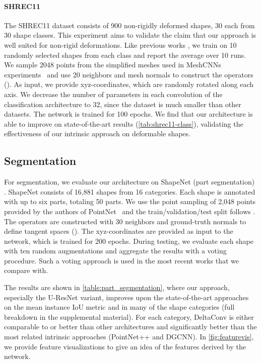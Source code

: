 \documentclass[acmtog, authorversion]{acmart}
\begin{document}
\paragraph{SHREC11}
The SHREC11 dataset \cite{lian2011} consists of 900 non-rigidly deformed shapes, 30 each from 30 shape classes. This experiment aims to validate the claim that our approach is well suited for non-rigid deformations. Like previous works \cite{hanocka2019meshcnn, Wiersma2020, Sharp2020DiffusionIA}, we train on 10 randomly selected shapes from each class and report the average over 10 runs. We sample 2048 points from the simplified meshes used in MeshCNNs experiments~\cite{hanocka2019meshcnn} and use 20 neighbors and mesh normals to construct the operators (). As input, we provide xyz-coordinates, which are randomly rotated along each axis. We decrease the number of parameters in each convolution of the classification architecture to 32, since the dataset is much smaller than other datasets. The network is trained for 100 epochs. We find that our architecture is able to improve on state-of-the-art results (\autoref{tab:shrec11-class}), validating the effectiveness of our intrinsic approach on deformable shapes.

\subsection{Segmentation}
For segmentation, we evaluate our architecture on ShapeNet (part segmentation) \cite{yi2016}.
ShapeNet consists of 16,881 shapes from 16 categories. Each shape is annotated with up to six parts, totaling 50 parts. We use the point sampling of 2,048 points provided by the authors of PointNet~\cite{Qi2017a} and the train/validation/test split follows \cite{Chang2015ShapeNet}. The operators are constructed with 30 neighbors and ground-truth normals to define tangent spaces (). The xyz-coordinates are provided as input to the network, which is trained for 200 epochs. During testing, we evaluate each shape with ten random augmentations and aggregate the results with a voting procedure. Such a voting approach is used in the most recent works that we compare with.

The results are shown in \autoref{table:part_segmentation}, where our approach, especially the U-ResNet variant, improves upon the state-of-the-art approaches on the mean instance IoU metric and in many of the shape categories (full breakdown in the supplemental material). For each category, DeltaConv is either comparable to or better than other architectures and significantly better than the most related intrinsic approaches (PointNet++ and DGCNN). In \autoref{fig:featurevis}, we provide feature visualizations to give an idea of the features derived by the network.
\end{document}
